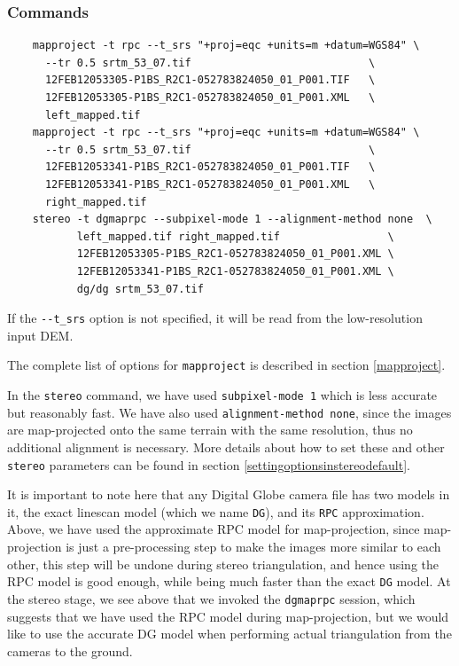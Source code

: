 \subsubsection*{Commands}

\begin{verbatim}
    mapproject -t rpc --t_srs "+proj=eqc +units=m +datum=WGS84" \
      --tr 0.5 srtm_53_07.tif                            \
      12FEB12053305-P1BS_R2C1-052783824050_01_P001.TIF   \
      12FEB12053305-P1BS_R2C1-052783824050_01_P001.XML   \
      left_mapped.tif
    mapproject -t rpc --t_srs "+proj=eqc +units=m +datum=WGS84" \
      --tr 0.5 srtm_53_07.tif                            \
      12FEB12053341-P1BS_R2C1-052783824050_01_P001.TIF   \
      12FEB12053341-P1BS_R2C1-052783824050_01_P001.XML   \
      right_mapped.tif
    stereo -t dgmaprpc --subpixel-mode 1 --alignment-method none  \
           left_mapped.tif right_mapped.tif                 \
           12FEB12053305-P1BS_R2C1-052783824050_01_P001.XML \
           12FEB12053341-P1BS_R2C1-052783824050_01_P001.XML \
           dg/dg srtm_53_07.tif
\end{verbatim}

If the \texttt{-\/-t\_srs} option is not specified, it will be read from
the low-resolution input DEM.

The complete list of options for \texttt{mapproject} is described in
section \ref{mapproject}.

In the \texttt{stereo} command, we have used \texttt{subpixel-mode 1}
which is less accurate but reasonably fast. We have also used
\texttt{alignment-method none}, since the images are map-projected onto
the same terrain with the same resolution, thus no additional alignment
is necessary. More details about how to set these and other
\texttt{stereo} parameters can be found in section
\ref{settingoptionsinstereodefault}.

It is important to note here that any Digital Globe camera file has two
models in it, the exact linescan model (which we name \texttt{DG}), and
its \texttt{RPC} approximation. Above, we have used the approximate RPC
model for map-projection, since map-projection is just a pre-processing
step to make the images more similar to each other, this step will be
undone during stereo triangulation, and hence using the RPC model is
good enough, while being much faster than the exact \texttt{DG}
model. At the stereo stage, we see above that we invoked the
\texttt{dgmaprpc} session, which suggests that we have used the RPC
model during map-projection, but we would like to use the accurate DG
model when performing actual triangulation from the cameras to the
ground.


